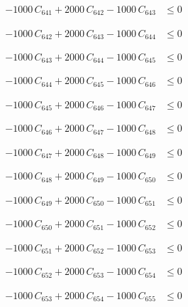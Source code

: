\documentclass[a4paper,11pt]{article}
\begin{document}
\begin{align}
-1000\,C_{641} + 2000\,C_{642} - 1000\,C_{643} &\leq 0 \nonumber
\end{align}

\begin{align}
-1000\,C_{642} + 2000\,C_{643} - 1000\,C_{644} &\leq 0 \nonumber
\end{align}

\begin{align}
-1000\,C_{643} + 2000\,C_{644} - 1000\,C_{645} &\leq 0 \nonumber
\end{align}

\begin{align}
-1000\,C_{644} + 2000\,C_{645} - 1000\,C_{646} &\leq 0 \nonumber
\end{align}

\begin{align}
-1000\,C_{645} + 2000\,C_{646} - 1000\,C_{647} &\leq 0 \nonumber
\end{align}

\begin{align}
-1000\,C_{646} + 2000\,C_{647} - 1000\,C_{648} &\leq 0 \nonumber
\end{align}

\begin{align}
-1000\,C_{647} + 2000\,C_{648} - 1000\,C_{649} &\leq 0 \nonumber
\end{align}

\begin{align}
-1000\,C_{648} + 2000\,C_{649} - 1000\,C_{650} &\leq 0 \nonumber
\end{align}

\begin{align}
-1000\,C_{649} + 2000\,C_{650} - 1000\,C_{651} &\leq 0 \nonumber
\end{align}

\begin{align}
-1000\,C_{650} + 2000\,C_{651} - 1000\,C_{652} &\leq 0 \nonumber
\end{align}

\begin{align}
-1000\,C_{651} + 2000\,C_{652} - 1000\,C_{653} &\leq 0 \nonumber
\end{align}

\begin{align}
-1000\,C_{652} + 2000\,C_{653} - 1000\,C_{654} &\leq 0 \nonumber
\end{align}

\begin{align}
-1000\,C_{653} + 2000\,C_{654} - 1000\,C_{655} &\leq 0 \nonumber
\end{align}
\end{document}
